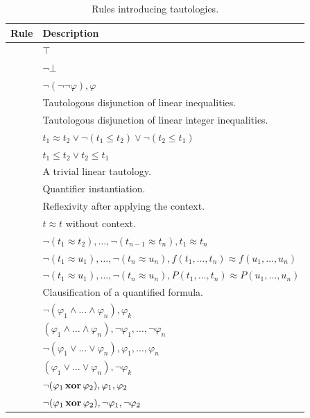\begin{xltabular}{\linewidth}{l X}
\caption{Rules introducing tautologies.}
\label{rule-tab:tautologies}\\
	Rule & Description \\
	\hline
{} & $\top$ \\
 & $\neg\bot$ \\
 & $\neg(\neg\neg\varphi), \varphi$ \\
 & Tautologous disjunction of linear inequalities. \\
 & Tautologous disjunction of linear integer inequalities. \\
 & $t_1 ≈ t_2 \lor \neg (t_1 \leq t_2) \lor \neg (t_2 \leq t_1)$ \\
 & $t_1 \leq t_2 \lor t_2 \leq t_1$ \\
 & A trivial linear tautology. \\
 & Quantifier instantiation. \\
 & Reflexivity after applying the context. \\
 & $t ≈ t$ without context. \\
 & $\neg (t_1 ≈ t_2) , \dots , \neg (t_{n-1} ≈ t_n) , t_1 ≈ t_n$ \\
 & $\neg (t_1 ≈ u_1) , \dots , \neg (t_n ≈ u_n) , f(t_1, \dots, t_n) ≈ f(u_1, \dots, u_n)$ \\
 & $\neg (t_1 ≈ u_1) , \dots , \neg (t_n ≈ u_n) , P(t_1, \dots, t_n) ≈ P(u_1, \dots, u_n)$ \\
 & Clausification of a quantified formula. \\
 & $\neg (\varphi_1 \land \dots \land \varphi_n) , \varphi_k $ \\
 & $ (\varphi_1 \land \dots \land \varphi_n), \neg\varphi_1  , \dots , \neg\varphi_n $ \\
 & $ \neg (\varphi_1 \lor \dots \lor \varphi_n) , \varphi_1 , \dots , \varphi_n $ \\
 & $ (\varphi_1 \lor \dots \lor \varphi_n) , \neg \varphi_k $ \\
 & $ \neg (\varphi_1 \,\mathbf{xor}\, \varphi_2) , \varphi_1 , \varphi_2 $ \\
 & $ \neg (\varphi_1 \,\mathbf{xor}\, \varphi_2), \neg \varphi_1, \neg \varphi_2 $ \\

\end{xltabular}
